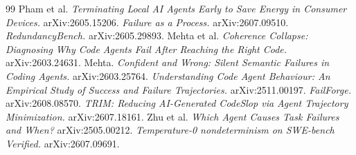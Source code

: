 \documentclass[10pt]{article}
\begin{document}
\newpage
\begin{thebibliography}{99}\small
{} Pham et al. \emph{Terminating Local AI Agents Early to Save Energy in Consumer
Devices.} arXiv:2605.15206.
 \emph{Failure as a Process.} arXiv:2607.09510.
 \emph{RedundancyBench.} arXiv:2605.29893.
 Mehta et al. \emph{Coherence Collapse: Diagnosing Why Code Agents Fail After
Reaching the Right Code.} arXiv:2603.24631.
 Mehta. \emph{Confident and Wrong: Silent Semantic Failures in Coding
Agents.} arXiv:2603.25764.
 \emph{Understanding Code Agent Behaviour: An Empirical Study of Success and
Failure Trajectories.} arXiv:2511.00197.
 \emph{FailForge.} arXiv:2608.08570.
 \emph{TRIM: Reducing AI-Generated CodeSlop via Agent Trajectory Minimization.}
arXiv:2607.18161.
 Zhu et al. \emph{Which Agent Causes Task Failures and When?} arXiv:2505.00212.
 \emph{Temperature-0 nondeterminism on SWE-bench Verified.} arXiv:2607.09691.
\end{thebibliography}


\end{document}
